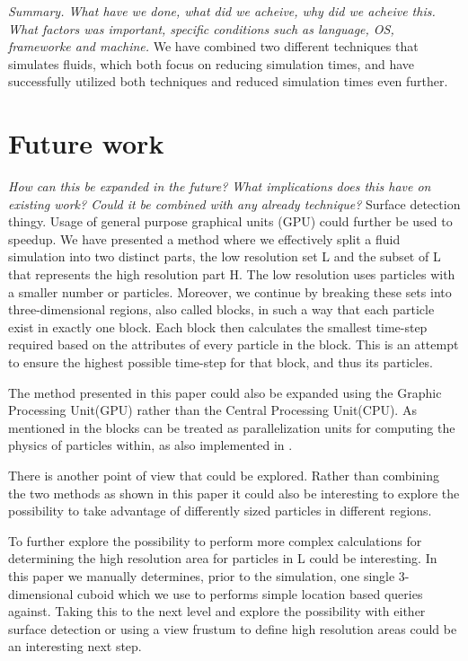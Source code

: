 \documentclass[../../main.tex]{subfiles}
\begin{document}

\textit{Summary. What have we done, what did we acheive, why did we acheive this. What factors was important, specific conditions such as language, OS, frameworke and machine.}
We have combined two different techniques that simulates fluids, which both focus on reducing simulation times, and have successfully utilized both techniques and reduced simulation times even further.


\section{Future work}
\textit{How can this be expanded in the future? What implications does this have on existing work? Could it be combined with any already technique?}
Surface detection thingy. 
Usage of general purpose graphical units (GPU) could further be used to speedup. 
We have presented a method where we effectively split a fluid simulation into two distinct parts, the low resolution set L and the subset of L that represents the high resolution part H. The low resolution uses particles with a smaller number or particles.
Moreover, we continue by breaking these sets into three-dimensional regions, also called blocks, in such a way that each particle exist in exactly one block. Each block then calculates the smallest time-step required based on the attributes of every particle in the block. This is an attempt to ensure the highest possible time-step for that block, and thus its particles. 

The method presented in this paper could also be expanded using the Graphic Processing Unit(GPU) rather than the Central Processing Unit(CPU). As mentioned in \cite{goswami2014regional} the blocks can be treated as parallelization units for computing the physics of particles within, as also implemented in \cite{goswami2010interactive}.

There is another point of view that could be explored. Rather than combining the two methods as shown in this paper it could also be interesting to explore the possibility to take advantage of differently sized particles in different regions.

To further explore the possibility to perform more complex calculations for determining the high resolution area for particles in L could be interesting. In this paper we manually determines, prior to the simulation, one single 3-dimensional cuboid which we use to performs simple location based queries against. Taking this to the next level and explore the possibility with either surface detection or using a view frustum to define high resolution areas could be an interesting next step. 
\end{document}
